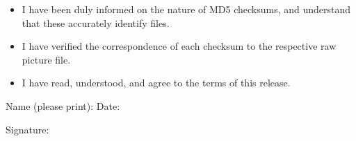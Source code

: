 \documentclass[a4paper,romanian,english]{article}
\begin{document}
\begin{itemize}
\renewcommand{\labelitemi}{$\Box$}
	\item I have been duly informed on the nature of MD5 checksums, and understand that these accurately identify files.
	\item I have verified the correspondence of each checksum to the respective raw picture file.
	\centering \item I have read, understood, and agree to the terms of this release.
\end{itemize}\vspace{0.15cm}

Name (please print): \hfill Date: \hspace{4cm}

\vspace{0.4cm}
Signature:
\vfill
\end{document}
